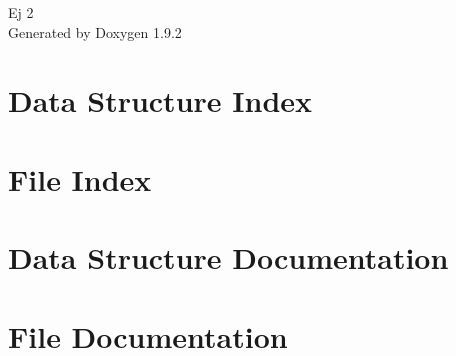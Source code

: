 \documentclass[twoside]{book}
\newcommand{\+}{\discretionary{\mbox{\scriptsize$\hookleftarrow$}}{}{}}
\newcommand{\clearemptydoublepage}{%
    \newpage{\pagestyle{empty}\cleardoublepage}%
  }
\begin{document}
  \raggedbottom
    \hypersetup{pageanchor=false,
                bookmarksnumbered=true,
                pdfencoding=unicode
               }
  \begin{titlepage}
  \vspace*{7cm}
  \begin{center}%
  {\Large Ej 2}\\
  \vspace*{1cm}
  {\large Generated by Doxygen 1.9.2}\\
  \end{center}
  \end{titlepage}
  \clearemptydoublepage
  \tableofcontents
  \clearemptydoublepage
  \hypersetup{pageanchor=true}
\chapter{Data Structure Index}

\chapter{File Index}

\chapter{Data Structure Documentation}

\chapter{File Documentation}

  \backmatter
  \newpage
  \clearemptydoublepage
  \printindex
\end{document}
